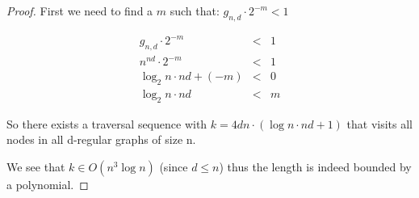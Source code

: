 \begin{proof}

First we need to find a $m$ such that: $g_{n, d} \cdot 2^{-m} < 1$

$$
\begin{array}{rcl}
    g_{n, d} \cdot 2^{-m} & < & 1 \\
    n^{nd} \cdot 2^{-m} & < & 1 \\
    \log_2 n \cdot n d + (-m) & < & 0 \\
    \log_2 n \cdot n d & < & m
\end{array}
$$

So there exists a traversal sequence with $k = 4dn \cdot (\log n \cdot n d + 1)$
that visits all nodes in all d-regular graphs of size n.

We see that $k \in O(n^3 \log n)$ (since $d \leq n$) thus the length is indeed bounded by a polynomial.

\end{proof}



